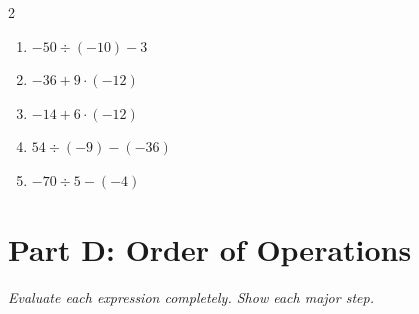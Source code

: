 \documentclass[11pt]{article}
\begin{document}
\begin{multicols}{2}
\begin{enumerate}
  \vspace{1.1cm}
  \item $-50 \div (-10) - 3$
  \vspace{1.1cm}
  \item $-36 + 9 \cdot (-12)$
  \vspace{1.1cm}
  \item $-14 + 6 \cdot (-12)$
  \vspace{1.1cm}
  \item $54 \div (-9) - (-36)$
  \vspace{1.1cm}
  \item $-70 \div 5 - (-4)$
  \vspace{1.1cm}
\end{enumerate}
\end{multicols}

\section*{Part D: Order of Operations}
\noindent\textit{Evaluate each expression completely. Show each major step.}
\end{document}
